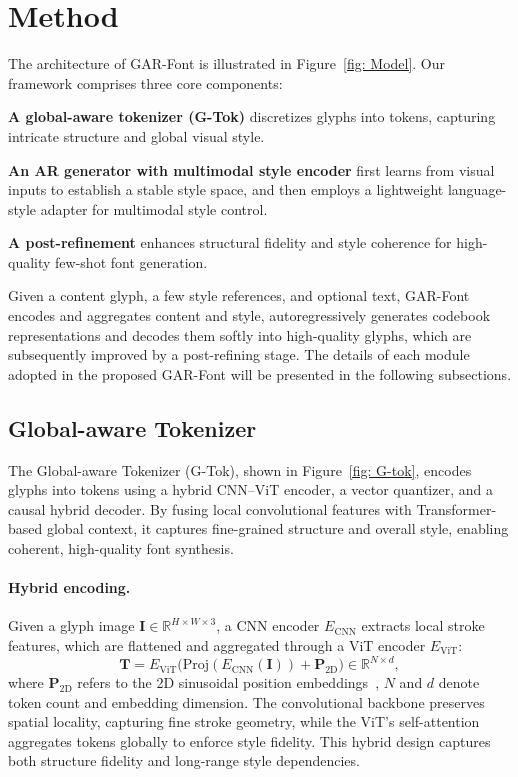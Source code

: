 \section{Method}
The architecture of GAR-Font is illustrated in Figure~\ref{fig: Model}. Our framework comprises three core components:

\noindent\textbf{A global-aware tokenizer (G-Tok)} discretizes glyphs into tokens, capturing intricate structure and global visual style.

\noindent\textbf{An AR generator with multimodal style encoder} first learns from visual inputs to establish a stable style space, and then employs a lightweight language-style adapter for multimodal style control.

\noindent\textbf{A post-refinement} enhances structural fidelity and style coherence for high-quality few-shot font generation.

Given a content glyph, a few style references, and optional text, GAR-Font encodes and aggregates content and style, autoregressively generates codebook representations and decodes them softly into high-quality glyphs, which are subsequently improved by a post-refining stage. The details of each module adopted in the proposed GAR-Font will be presented in the following subsections.

\subsection{Global-aware Tokenizer}
The Global-aware Tokenizer (G-Tok), shown in Figure~\ref{fig: G-tok}, encodes glyphs into tokens using a hybrid CNN–ViT encoder, a vector quantizer, and a causal hybrid decoder. By fusing local convolutional features with Transformer-based global context, it captures fine-grained structure and overall style, enabling coherent, high-quality font synthesis.

\vspace{-3mm}
\paragraph{Hybrid encoding.} Given a glyph image $\mathbf{I} \in \mathbb{R}^{H \times W \times 3}$, a CNN encoder $E_{\text{CNN}}$ extracts local stroke features, which are flattened and aggregated through a ViT encoder $E_{\text{ViT}}$:
\begin{equation}
    \mathbf{T} = E_{\text{ViT}}\big(\mathrm{Proj}(E_{\text{CNN}}(\mathbf{I})) + \mathbf{P}_{\text{2D}}\big) \in \mathbb{R}^{N\times d},
\end{equation}
where $\mathbf{P}_{\text{2D}}$ refers to the 2D sinusoidal position embeddings~\cite{ViT}, $N$ and $d$ denote token count and embedding dimension. The convolutional backbone preserves spatial locality, capturing fine stroke geometry, while the ViT’s self-attention aggregates tokens globally to enforce style fidelity. This hybrid design captures both structure fidelity and long-range style dependencies.
\vspace{-4mm}
